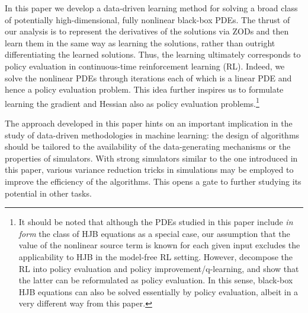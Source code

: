 \documentclass[twoside,11pt]{article}
\newcommand{\1}{\mathbf{1}}
\numberwithin{equation}{section}
\begin{document}
In this paper we develop a data-driven learning method for solving a broad class of potentially high-dimensional, fully nonlinear black-box PDEs. The thrust of our analysis is to represent the derivatives of the solutions via ZODs and then learn them in the same way as learning the solutions, rather than outright differentiating the learned solutions. Thus, the learning ultimately corresponds to policy evaluation \citep{jia2022policy} in continuous-time reinforcement learning (RL). Indeed, we solve the nonlinear PDEs through iterations each of which is a linear PDE and hence a policy evaluation problem. This idea further inspires us to formulate learning the gradient and Hessian also as policy evaluation problems.\footnote{It should be noted that although the PDEs studied in this paper include {\it in form} the class of HJB equations as a special case, our assumption that the value of the nonlinear source term is known for each given input excludes the applicability to HJB in the model-free RL setting.
However, \cite{jia2022pg,jia2022q} decompose the RL into policy evaluation and policy improvement/q-learning, and show that the latter can be reformulated as policy evaluation. In this sense, black-box HJB equations can also be solved essentially by policy evaluation, albeit in a very different way from this paper. }




The approach developed in this paper hints on an important implication in the study of data-driven methodologies in machine learning: the design of algorithms should be tailored to the availability of the data-generating mechanisms or the properties of simulators. With strong simulators similar to the one introduced in this paper, various variance reduction tricks in simulations may be employed to improve the efficiency of the algorithms. This opens a gate to further studying its potential in other tasks.




\end{document}
